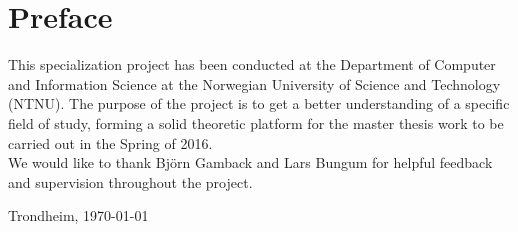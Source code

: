 \section*{Preface}

This specialization project has been conducted at the Department of Computer and Information Science at the Norwegian University of Science and Technology (NTNU). The purpose of the project is to get a better understanding of a specific field of study, forming a solid theoretic platform for the master thesis work to be carried out in the Spring of 2016. \\

We would like to thank Björn Gamback and Lars Bungum for helpful feedback and supervision throughout the project.

\vfill

\hfill \thesisAuthor

\hfill Trondheim, \today
